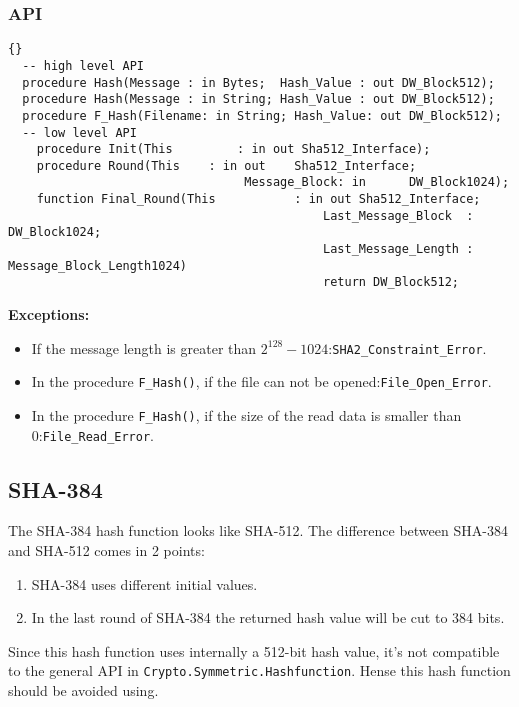 \subsubsection*{API}
\begin{lstlisting}{}
  -- high level API
  procedure Hash(Message : in Bytes;  Hash_Value : out DW_Block512);
  procedure Hash(Message : in String; Hash_Value : out DW_Block512);
  procedure F_Hash(Filename: in String; Hash_Value: out DW_Block512); 
  -- low level API
	procedure Init(This 		: in out Sha512_Interface);
	procedure Round(This 	: in out 	Sha512_Interface;
								 Message_Block: in 		DW_Block1024);
	function Final_Round(This 		    : in out Sha512_Interface;
											Last_Message_Block  : DW_Block1024;
											Last_Message_Length : Message_Block_Length1024)
											return DW_Block512;

\end{lstlisting}
\textbf{Exceptions:}
\begin{itemize}
\item If the message length is greater than
  $2^{128}-1024$:\quad\texttt{SHA2\_Constraint\_Error}.
\item In the procedure \texttt{F\_Hash()}, if the file can not be
  opened:\quad\texttt{File\_Open\_Error}.
\item In the procedure \texttt{F\_Hash()}, if the size of the read
  data is smaller than 0:\quad\texttt{File\_Read\_Error}.
\end{itemize}


\subsection{SHA-384}
The SHA-384 hash function looks like SHA-512. The difference between
SHA-384 and SHA-512 comes in 2 points:
\begin{enumerate}
\item SHA-384 uses different initial values.
\item In the last round of SHA-384 the returned hash value will be  cut to 384 bits.
\end{enumerate}
Since this hash function uses internally a 512-bit hash value, it's
not compatible to the general API in
\texttt{Crypto.Symmetric.Hashfunction}. Hense this hash function
should be avoided using.
